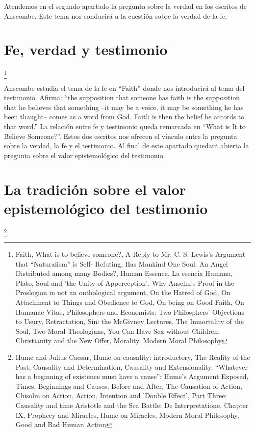 \documentclass[../main.tex]{subfiles}
\begin{document}
Atendemos en el segundo apartado la pregunta sobre la verdad en los escritos de Anscombe. Este tema nos conducirá a la cuestión sobre la verdad de la fe.

\section{Fe, verdad y testimonio}
\footnote{
Faith, 
What is to believe someone?, 
A Reply to Mr. C. S. Lewis's Argument that “Naturalism” is Self- Refuting, 
Has Mankind One Soul: An Angel Distributed among many Bodies?, 
Human Essence, 
La esencia Humana, 
Plato, Soul and 'the Unity of Apperception', 
Why Anselm's Proof in the Proslogion in not an onthological argument, 
On the Hatred of God, 
On Attachment to Things and Obedience to God, 
On being on Good Faith, 
On Humanae Vitae, 
Philosophers and Economists: Two Philosphers' Objections to Usury, 
Retractation, 
Sin: the McGivney Lectures, 
The Inmortality of the Soul, 
Two Moral Theologians, 
You Can Have Sex without Children: Christianity and the New Offer, 
Morality, 
Modern Moral Philosophy
}

Anscombe estudia el tema de la fe en ``Faith'' donde nos introducirá al tema del testimonio. Afirma: ``the supposition that someone has faith is the supposition that he believes that something --it may be a voice, it may be something he has been thaught-- comes as a word from God. Faith is then the belief he accords to that word.'' La relación entre fe y testimonio queda remarcada en ``What is It to Believe Someone?''. Estos dos escritos nos ofrecen el vínculo entre la pregunta sobre la verdad, la fe y el testimonio. Al final de este apartado quedará abierta la pregunta sobre el valor epistemológico del testimonio.

\section{La tradición sobre el valor epistemológico del testimonio}
\footnote{
Hume and Julius Caesar, 
Hume on causality: introductory, 
The Reality of the Past, 
Causality and Determination, 
Causality and Extensionality, 
“Whatever has a beginning of existence must have a cause”: Hume's Argument Exposed, 
Times, Beginnings and Causes, 
Before and After, 
The Causation of Action, 
Chisolm on Action, 
Action, Intention and 'Double Effect', 
Part Three: Causality and time
Aristotle and the Sea Battle: De Interpretatione, Chapter IX, 
Prophecy and Miracles, 
Hume on Miracles, 
Modern Moral Philosophy, 
Good and Bad Human Action
}
\end{document}
